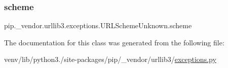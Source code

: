 \subsubsection{\texorpdfstring{scheme}{scheme}}
{\footnotesize\ttfamily pip.\+\_\+vendor.\+urllib3.\+exceptions.\+U\+R\+L\+Scheme\+Unknown.\+scheme}



The documentation for this class was generated from the following file\+:\begin{DoxyCompactItemize}
\item 
venv/lib/python3./site-\/packages/pip/\+\_\+vendor/urllib3/\hyperlink{pip_2__vendor_2urllib3_2exceptions_8py}{exceptions.\+py}\end{DoxyCompactItemize}
